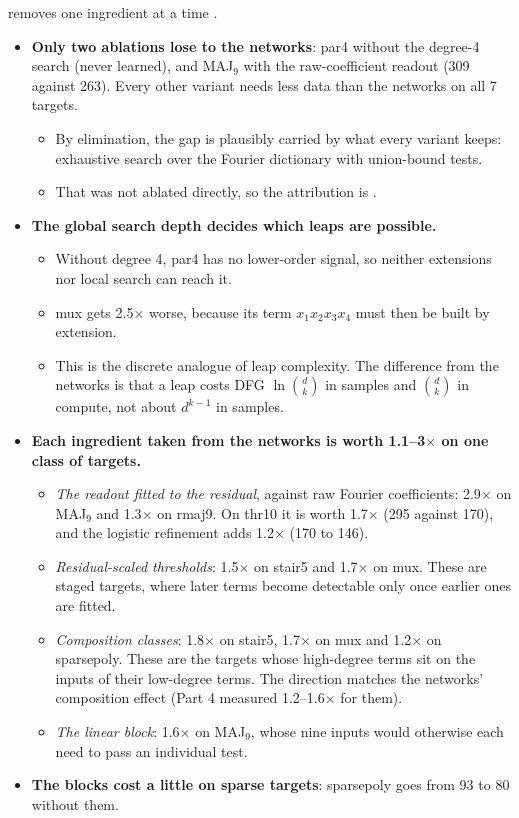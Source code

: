  removes one ingredient at a time .
\begin{itemize}
\item \textbf{Only two ablations lose to the networks}: par4 without the degree-4 search (never learned), and MAJ$_9$ with the raw-coefficient readout (309 against 263). Every other variant needs less data than the networks on all 7 targets.
  \begin{itemize}
  \item By elimination, the gap is plausibly carried by what every variant keeps: exhaustive search over the Fourier dictionary with union-bound tests.
  \item That was not ablated directly, so the attribution is .
  \end{itemize}
\item \textbf{The global search depth decides which leaps are possible.}
  \begin{itemize}
  \item Without degree 4, par4 has no lower-order signal, so neither extensions nor local search can reach it.
  \item mux gets 2.5$\times$ worse, because its term $x_1x_2x_3x_4$ must then be built by extension.
  \item This is the discrete analogue of leap complexity. The difference from the networks is that a leap costs DFG $\ln\binom dk$ in samples and $\binom dk$ in compute, not about $d^{k-1}$ in samples.
  \end{itemize}
\item \textbf{Each ingredient taken from the networks is worth 1.1--3$\times$ on one class of targets.}
  \begin{itemize}
  \item \emph{The readout fitted to the residual}, against raw Fourier coefficients: 2.9$\times$ on MAJ$_9$ and 1.3$\times$ on rmaj9. On thr10 it is worth 1.7$\times$ (295 against 170), and the logistic refinement adds 1.2$\times$ (170 to 146).
  \item \emph{Residual-scaled thresholds}: 1.5$\times$ on stair5 and 1.7$\times$ on mux. These are staged targets, where later terms become detectable only once earlier ones are fitted.
  \item \emph{Composition classes}: 1.8$\times$ on stair5, 1.7$\times$ on mux and 1.2$\times$ on sparsepoly. These are the targets whose high-degree terms sit on the inputs of their low-degree terms. The direction matches the networks' composition effect (Part 4 measured 1.2--1.6$\times$ for them).
  \item \emph{The linear block}: 1.6$\times$ on MAJ$_9$, whose nine inputs would otherwise each need to pass an individual test.
  \end{itemize}
\item \textbf{The blocks cost a little on sparse targets}: sparsepoly goes from 93 to 80 without them.
\end{itemize}

